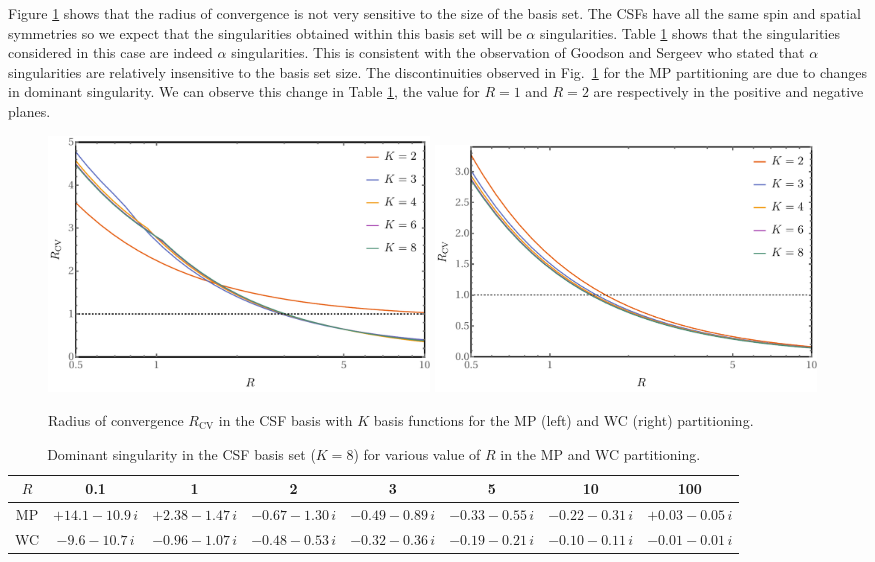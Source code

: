 \documentclass[11pt,a4paper]{article}
\begin{document}
Figure \ref{fig:RadiusBasis} shows that the radius of convergence is not very sensitive to the size of the basis set. The CSFs have all the same spin and spatial symmetries so we expect that the singularities obtained within this basis set will be $\alpha$ singularities. Table \ref{tab:SingAlpha} shows that the singularities considered in this case are indeed $\alpha$ singularities. This is consistent with the observation of Goodson and Sergeev \cite{Goodson_2004} who stated that $\alpha$ singularities are relatively insensitive to the basis set size. The discontinuities observed in Fig.~\ref{fig:RadiusBasis} for the MP partitioning are due to changes in dominant singularity. We can observe this change in Table \ref{tab:SingAlpha}, the value for $R=1$ and $R=2$ are respectively in the positive and negative planes.

\begin{figure}[h!]
    \centering
    \includegraphics[width=0.49\textwidth]{MPlargebasis.pdf}
    \includegraphics[width=0.49\textwidth]{WCElargebasis.pdf}
    \caption{Radius of convergence $R_{\text{CV}}$ in the CSF basis with $K$ basis functions for the MP (left) and WC (right) partitioning.}
    \label{fig:RadiusBasis}
\end{figure}

\begin{table}
\centering
\footnotesize
\caption{Dominant singularity in the CSF basis set ($K=8$) for various value of $R$ in the MP and WC partitioning.}
\begin{tabular}{cccccccc}
\hline
\hline
$R$ & 0.1 & 1 & 2 & 3 & 5 & 10 & 100 \\
\hline
MP & $+14.1-10.9\,i$ & $+2.38-1.47\,i$ & $-0.67-1.30\,i$ & $-0.49-0.89\,i$ & $-0.33-0.55\,i$ & $-0.22-0.31\,i$ & $+0.03-0.05\,i$ \\
WC & $-9.6-10.7\,i$ & $-0.96-1.07\,i$ & $-0.48-0.53\,i$ & $-0.32-0.36\,i$ & $-0.19-0.21\,i$ & $-0.10-0.11\,i$ & $-0.01-0.01\,i$ \\
\hline
\hline
\end{tabular}
\label{tab:SingAlpha}
\end{table}
\end{document}
